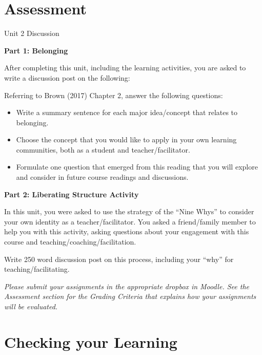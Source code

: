 \documentclass[
]{book}
\providecommand{\tightlist}{%
  \setlength{\itemsep}{0pt}\setlength{\parskip}{0pt}}
\begin{document}
\hypertarget{assessment-1}{%
\section*{Assessment}\label{assessment-1}}

\begin{assessment}
{Unit 2 Discussion}

\textbf{Part 1: Belonging}

After completing this unit, including the learning activities, you are
asked to write a discussion post on the following:

Referring to Brown (2017) Chapter 2, answer the following questions:

\begin{itemize}
\tightlist
\item
  Write a summary sentence for each major idea/concept that relates to
  belonging.\\
\item
  Choose the concept that you would like to apply in your own learning
  communities, both as a student and teacher/facilitator.\\
\item
  Formulate one question that emerged from this reading that you will
  explore and consider in future course readings and discussions.
\end{itemize}

\textbf{Part 2: Liberating Structure Activity}

In this unit, you were asked to use the strategy of the ``Nine Whys'' to
consider your own identity as a teacher/facilitator. You asked a
friend/family member to help you with this activity, asking questions
about your engagement with this course and
teaching/coaching/facilitation.

Write 250 word discussion post on this process, including your ``why''
for teaching/facilitating.
\end{assessment}

\begin{caution}
\emph{Please submit your assignments in the appropriate dropbox in
Moodle. See the Assessment section for the Grading Criteria that
explains how your assignments will be evaluated.}
\end{caution}

\hypertarget{checking-your-learning-1}{%
\section*{Checking your Learning}\label{checking-your-learning-1}}
\end{document}
